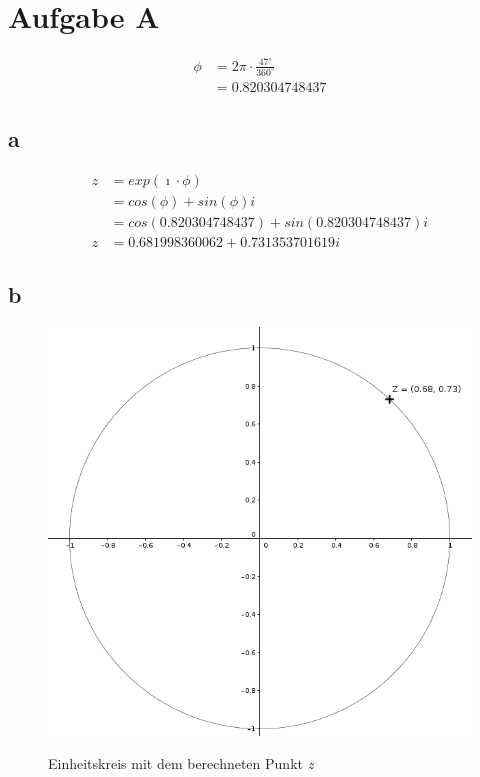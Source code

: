 \documentclass{../Vorlage/mat}
\begin{document}
 \\

\section*{Aufgabe A}
\begin{align*}
\phi & = 2 \pi \cdot \frac{47^{\circ}}{360^{\circ}}\\
& = 0.820304748437 
\end{align*}

\subsection*{a}
\begin{align*}
z & = exp(\imath \cdot \phi)\\
& = cos(\phi) + sin(\phi)i\\
& = cos(0.820304748437) + sin(0.820304748437)i\\
z & = 0.681998360062 + 0.731353701619i
\end{align*}
\newpage

\subsection*{b}
\begin{figure}[!htb]
\centering
	\includegraphics[scale=0.5]{circle_z.png}
	\label{circlez}
	\caption{Einheitskreis mit dem berechneten Punkt \textit{z}}
\end{figure}
\newpage
\end{document}
